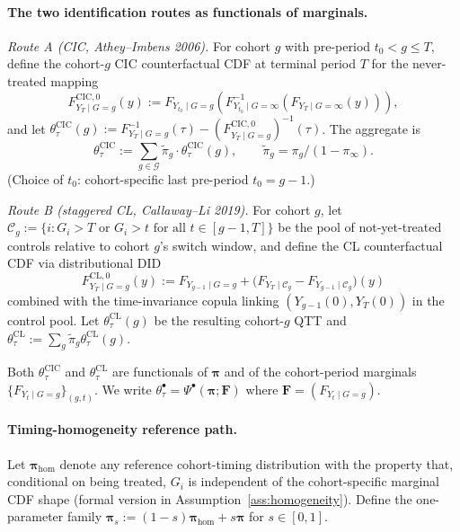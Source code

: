\documentclass[11pt]{article}
\theoremstyle{definition}
\theoremstyle{plain}
\theoremstyle{remark}
\begin{document}
\paragraph{The two identification routes as functionals of marginals.}

\emph{Route A (CIC, Athey--Imbens 2006).} For cohort $g$ with pre-period $t_0 < g \leq T$, define the cohort-$g$ CIC counterfactual CDF at terminal period $T$ for the never-treated mapping
\[ F^{\mathrm{CIC}, 0}_{Y_T \mid G=g}(y) := F_{Y_{t_0} \mid G=g} \!\left( F^{-1}_{Y_{t_0} \mid G=\infty} \!\left( F_{Y_T \mid G=\infty}(y) \right) \right), \]
and let $\theta_\tau^{\mathrm{CIC}}(g) := F^{-1}_{Y_T \mid G=g}(\tau) - (F^{\mathrm{CIC},0}_{Y_T \mid G=g})^{-1}(\tau)$. The aggregate is
\[ \theta^{\mathrm{CIC}}_\tau := \sum_{g \in \mathcal{G}} \tilde\pi_g \cdot \theta_\tau^{\mathrm{CIC}}(g), \qquad \tilde\pi_g = \pi_g/(1-\pi_\infty). \]
(Choice of $t_0$: cohort-specific last pre-period $t_0 = g-1$.)

\emph{Route B (staggered CL, Callaway--Li 2019).} For cohort $g$, let $\mathcal{C}_g := \{i : G_i > T \text{ or } G_i > t \text{ for all } t \in [g-1, T]\}$ be the pool of not-yet-treated controls relative to cohort $g$'s switch window, and define the CL counterfactual CDF via distributional DID
\[ F^{\mathrm{CL}, 0}_{Y_T \mid G=g}(y) := F_{Y_{g-1} \mid G=g} + \big( F_{Y_T \mid \mathcal{C}_g} - F_{Y_{g-1} \mid \mathcal{C}_g} \big)(y) \]
combined with the time-invariance copula linking $(Y_{g-1}(0), Y_T(0))$ in the control pool. Let $\theta^{\mathrm{CL}}_\tau(g)$ be the resulting cohort-$g$ QTT and $\theta^{\mathrm{CL}}_\tau := \sum_g \tilde\pi_g \theta^{\mathrm{CL}}_\tau(g)$.

Both $\theta^{\mathrm{CIC}}_\tau$ and $\theta^{\mathrm{CL}}_\tau$ are functionals of $\boldsymbol\pi$ and of the cohort-period marginals $\{F_{Y_t \mid G=g}\}_{(g,t)}$. We write $\theta^{\bullet}_\tau = \Psi^\bullet(\boldsymbol\pi; \mathbf{F})$ where $\mathbf{F} = (F_{Y_t \mid G=g})$.

\paragraph{Timing-homogeneity reference path.} Let $\boldsymbol\pi_{\mathrm{hom}}$ denote any reference cohort-timing distribution with the property that, conditional on being treated, $G_i$ is independent of the cohort-specific marginal CDF shape (formal version in Assumption~\ref{ass:homogeneity}). Define the one-parameter family $\boldsymbol\pi_s := (1-s)\boldsymbol\pi_{\mathrm{hom}} + s\boldsymbol\pi$ for $s \in [0,1]$.
\end{document}
